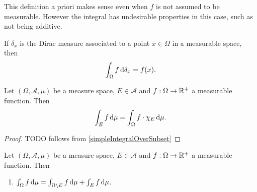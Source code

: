This definition a priori makes sense even when $f$ is not assumed to be measurable. However the integral has undesirable properties in this case, such as not being additive.

\begin{example}
If $\delta_x$ is the Dirac measure associated to a point $x\in\Omega$ in a measurable space, then
\[ \int_\Omega f \operatorname{d \!}{\delta_x} = f(x). \]
\end{example}

\begin{lemma} \label{integralOverSubset}
Let $(\Omega, \mathcal{A}, \mu)$ be a measure space, $E\in\mathcal{A}$ and $f:\Omega\to \mathbb{R}^+$ a measurable function. Then
\[ \int_E f \operatorname{d \!}{\mu} = \int_\Omega f\cdot\chi_{E} \operatorname{d \!}{\mu}. \]
\end{lemma}
\begin{proof}
TODO follows from \ref{simpleIntegralOverSubset}
\end{proof}
\begin{corollary}
Let $(\Omega, \mathcal{A}, \mu)$ be a measure space, $E\in\mathcal{A}$ and $f:\Omega\to \mathbb{R}^+$ a measurable function. Then
\begin{enumerate}
\item $\int_\Omega f\operatorname{d \!}{\mu} = \int_{\Omega\setminus E} f\operatorname{d \!}{\mu}+\int_E f\operatorname{d \!}{\mu}$.
\end{enumerate}
\end{corollary}

